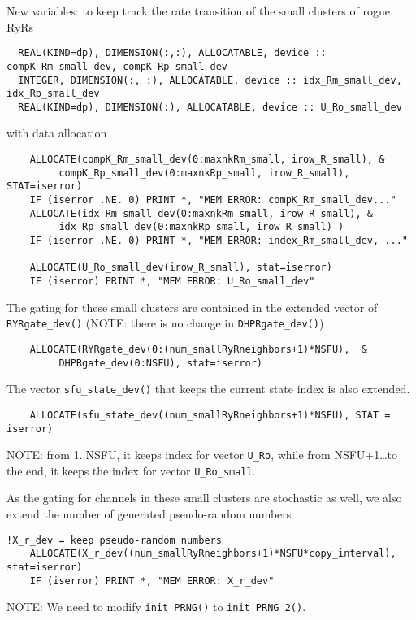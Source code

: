New variables: to keep track the rate transition of the small clusters of rogue
RyRs
\begin{verbatim}
  REAL(KIND=dp), DIMENSION(:,:), ALLOCATABLE, device :: compK_Rm_small_dev, compK_Rp_small_dev
  INTEGER, DIMENSION(:, :), ALLOCATABLE, device :: idx_Rm_small_dev, idx_Rp_small_dev
  REAL(KIND=dp), DIMENSION(:), ALLOCATABLE, device :: U_Ro_small_dev
\end{verbatim}
with data allocation
\begin{verbatim}
    ALLOCATE(compK_Rm_small_dev(0:maxnkRm_small, irow_R_small), &
         compK_Rp_small_dev(0:maxnkRp_small, irow_R_small), STAT=iserror)
    IF (iserror .NE. 0) PRINT *, "MEM ERROR: compK_Rm_small_dev..."
    ALLOCATE(idx_Rm_small_dev(0:maxnkRm_small, irow_R_small), &
         idx_Rp_small_dev(0:maxnkRp_small, irow_R_small) )
    IF (iserror .NE. 0) PRINT *, "MEM ERROR: index_Rm_small_dev, ..."
    
    ALLOCATE(U_Ro_small_dev(irow_R_small), stat=iserror)
    IF (iserror) PRINT *, "MEM ERROR: U_Ro_small_dev" 
\end{verbatim}
The gating for these small clusters are contained in the extended vector of
\verb!RYRgate_dev()! (NOTE: there is no change in \verb!DHPRgate_dev()!)
\begin{verbatim}
    ALLOCATE(RYRgate_dev(0:(num_smallRyRneighbors+1)*NSFU),  &
         DHPRgate_dev(0:NSFU), stat=iserror)
\end{verbatim}

The vector \verb!sfu_state_dev()! that keeps the current state index is
also extended. 
\begin{verbatim}
    ALLOCATE(sfu_state_dev((num_smallRyRneighbors+1)*NSFU), STAT = iserror)
\end{verbatim}
NOTE: from 1..NSFU, it keeps index for vector \verb!U_Ro!, while from
NSFU+1\ldots to the end, it keeps the index for vector \verb!U_Ro_small!. 

As the gating for channels in these small clusters are stochastic as well, we
also extend the number of generated pseudo-random numbers
\begin{verbatim}
!X_r_dev = keep pseudo-random numbers
    ALLOCATE(X_r_dev((num_smallRyRneighbors+1)*NSFU*copy_interval), stat=iserror) 
    IF (iserror) PRINT *, "MEM ERROR: X_r_dev"
\end{verbatim}
NOTE: We need to modify \verb!init_PRNG()! to \verb!init_PRNG_2()!.

